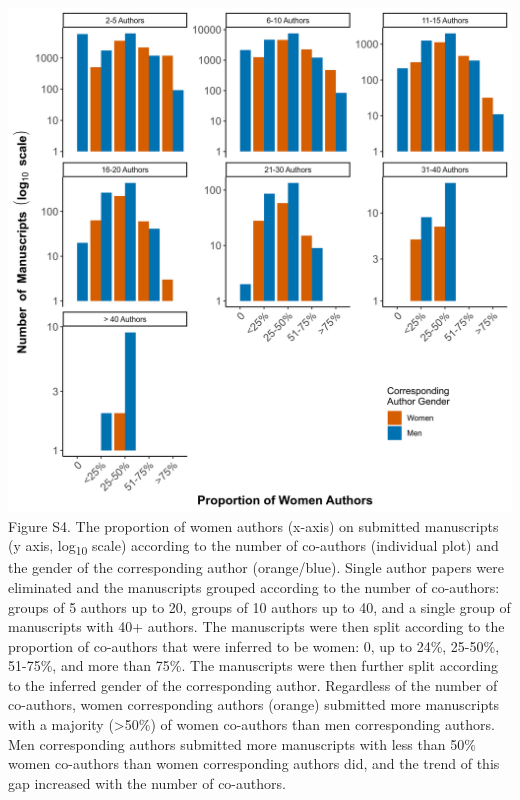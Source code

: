 \documentclass[11pt,]{article}
\begin{document}
\includegraphics{Figure_S4.png} Figure S4. The proportion of women
authors (x-axis) on submitted manuscripts (y axis, log\textsubscript{10}
scale) according to the number of co-authors (individual plot) and the
gender of the corresponding author (orange/blue). Single author papers
were eliminated and the manuscripts grouped according to the number of
co-authors: groups of 5 authors up to 20, groups of 10 authors up to 40,
and a single group of manuscripts with 40+ authors. The manuscripts were
then split according to the proportion of co-authors that were inferred
to be women: 0, up to 24\%, 25-50\%, 51-75\%, and more than 75\%. The
manuscripts were then further split according to the inferred gender of
the corresponding author. Regardless of the number of co-authors, women
corresponding authors (orange) submitted more manuscripts with a
majority (\textgreater50\%) of women co-authors than men corresponding
authors. Men corresponding authors submitted more manuscripts with less
than 50\% women co-authors than women corresponding authors did, and the
trend of this gap increased with the number of co-authors.

\newpage
\end{document}
